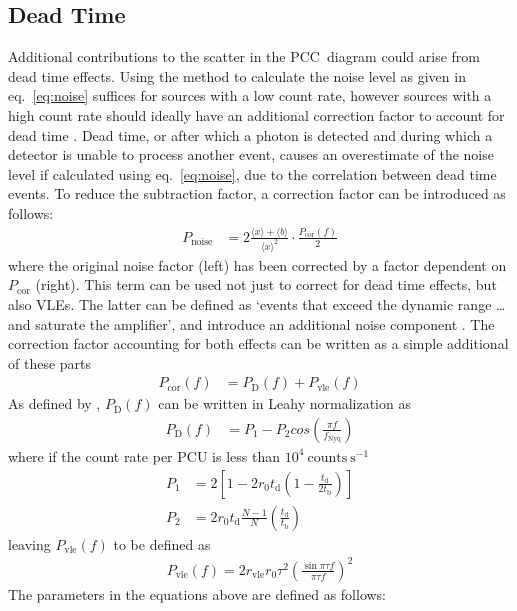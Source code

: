 \subsection{Dead Time}
Additional contributions to the scatter in the \ac{PCC}~diagram could arise from dead time effects. Using the method to calculate the noise level as given in eq.~\ref{eq:noise} suffices for sources with a low count rate, however sources with a high count rate should ideally have an additional correction factor to account for dead time \citep{rxtecookbookdeadtime, weideadtime}. Dead time, or after which a photon is detected and during which a detector is unable to process another event, causes an overestimate of the noise level if calculated using eq.~\ref{eq:noise}, due to the correlation between dead time events. To reduce the subtraction factor, a correction factor can be introduced as follows:
\begin{align}
P_{\textrm{noise}} &=2\frac{\langle x \rangle + \langle b \rangle}{\langle x \rangle ^2} \cdot \frac{P_\textrm{cor}(f)}{2} %
\end{align}
where the original noise factor (left) has been corrected by a factor dependent on $P_\textrm{cor}$ (right). This term can be used not just to correct for dead time effects, but also \acp{VLE}. The latter can be defined as `events that exceed the dynamic range \ldots and saturate the amplifier', and introduce an additional noise component \citep{jahoda2006calibration}. The correction factor accounting for both effects can be written as a simple additional of these parts
\begin{align}
P_\textrm{cor}(f) &= P_\textrm{D}(f) + P_\textrm{vle}(f)
\end{align}
As defined by \citet{jahoda2006calibration}, $P_\textrm{D}(f)$ can be written in Leahy normalization as
\begin{align}
P_\textrm{D} (f) &= P_1 - P_2 cos\left( \frac{{\pi f}}{ f_\textrm{Nyq}}\right)
\end{align}
where if the count rate per \ac{PCU} is less than $10^4\ \textrm{counts}\ \textrm{s}^{-1}$
\begin{align}
P_1 &= 2\left[ 1-2r_0t_\textrm{d} \left( 1- \frac{t_\textrm{d}}{2t_\textrm{b}}\right)\right]\\
P_2 &=  2 r_0 t_\textrm{d} \frac{N-1}{N}\left(\frac{t_\textrm{d}}{t_\textrm{b}}\right)
\end{align}
leaving $P_\textrm{vle}(f)$ to be defined as
\begin{align} 
P_\textrm{vle}(f) = 2r_\textrm{vle}r_0\tau^2\left({\frac{\sin{\pi\tau f}}{\pi\tau f}}\right)^2
\end{align}
The parameters in the equations above are defined as follows:

